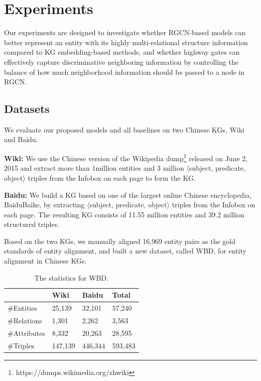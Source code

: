 
	\section{Experiments}
	Our experiments are designed to investigate whether RGCN-based models can better represent an entity with its highly multi-relational structure information compared to KG embedding-based methods, and whether highway gates can effectively capture discriminative neighboring information by controlling the balance of how much neighborhood information should be passed to a node in RGCN.
	
	
	\subsection{Datasets}
	We evaluate our proposed models and all baselines on two Chinese KGs, Wiki and Baidu.
	
	\noindent \textbf{Wiki:} %
	We use the Chinese version of the Wikipedia dump\footnote{https://dumps.wikimedia.org/zhwiki} released on June 2, 2015
	and extract more than 1million entities and 3 million $\langle$subject, predicate, object$\rangle$ triples from the Infobox on each page to form the KG.
	
	\noindent \textbf{Baidu:} We build a KG based on one of the largest online Chinese encyclopedia, BaiduBaike,
	by extracting $\langle$subject, predicate, object$\rangle$ triples from the Infobox on each page.
	The resulting KG consists of 11.55 million entities and 39.2 million structured triples.
	
	Based on the two KGs, we manually aligned 16,969 entity pairs as the gold standards of entity alignment, and built a new dataset, called WBD, for entity alignment in Chinese KGs.
	\begin{table}
		\centering
		\begin{tabular}{llll}
			\toprule
			& Wiki & Baidu & Total \\
			\midrule
			\#Entities & 25,139 & 32,101 & 57,240 \\
			\#Relations & 1,301 & 2,262 & 3,563 \\
			\#Attributes & 8,332 & 20,263 & 28,595 \\
			\#Triples & 147,139 & 446,344 & 593,483 \\
			\bottomrule
		\end{tabular}
		\caption{The statistics for WBD.}
		\label{dataset}
	\end{table}
	
